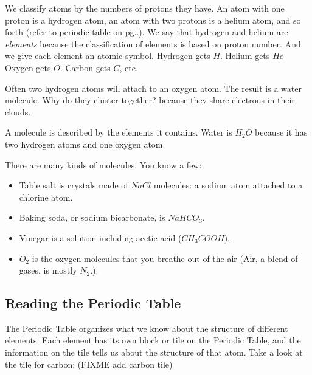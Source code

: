 We classify atoms by the numbers of protons they have. An atom with one proton is a
hydrogen atom, an atom with two protons is a helium atom, and so forth (refer to periodic table on pg..). We say that hydrogen and helium are \textit{elements} because the classification of elements is based on proton number. And we give
each element an atomic symbol. Hydrogen gets $H$. Helium gets $He$ Oxygen gets
$O$. Carbon gets $C$, etc.

Often two hydrogen atoms will attach to an oxygen atom. The result is
a water molecule. Why do they cluster together? because they share
electrons in their clouds.

A molecule is described by the elements it contains. Water is $H_2O$
because it has two hydrogen atoms and one oxygen atom.

There are many kinds of molecules. You know a few:
\begin{itemize}
\item Table salt is crystals made of $NaCl$ molecules: a sodium atom attached to a chlorine atom.
\item Baking soda, or sodium bicarbonate, is $NaHCO_3$.
\item Vinegar is a solution including acetic acid ($CH_3COOH$).
\item $O_2$ is the oxygen molecules that you breathe out of the air (Air, a blend of gases, is mostly $N_2$.).
\end{itemize}

\subsection{Reading the Periodic Table}
The Periodic Table organizes what we know about the structure of different
elements. Each element has its own block or tile on the Periodic Table, and the
information on the tile tells us about the structure of that atom. Take a look at
the tile for carbon: (FIXME add carbon tile)


